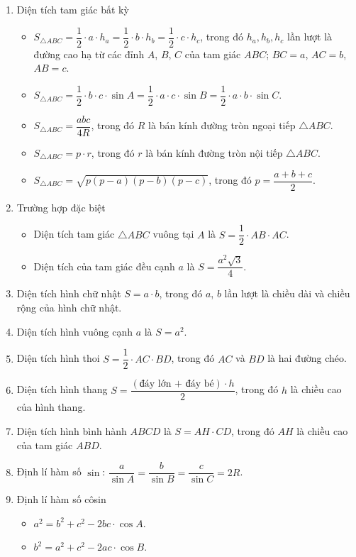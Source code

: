 \begin{khung}
\begin{enumerate}
		\item Diện tích tam giác bất kỳ
		\begin{itemize}
			\item $S_{\triangle ABC}=\dfrac{1}{2}\cdot a\cdot h_a=\dfrac{1}{2}\cdot b\cdot h_b=\dfrac{1}{2}\cdot c\cdot h_c$, trong đó $h_a, h_b, h_c$ lần lượt là đường cao hạ từ các đỉnh $A$, $B$, $C$ của tam giác $ABC$; $BC=a$, $AC=b$, $AB=c$.
			\item $S_{\triangle ABC} =\dfrac{1}{2}\cdot b\cdot c\cdot \sin A=\dfrac{1}{2}\cdot a\cdot c\cdot \sin B =\dfrac{1}{2}\cdot a\cdot b\cdot \sin C$.
			\item $S_{\triangle ABC}=\dfrac{abc}{4R}$, trong đó $R$ là bán kính đường tròn ngoại tiếp $\triangle ABC$.
			\item $S_{\triangle ABC}=p\cdot r$, trong đó $r$ là bán kính đường tròn nội tiếp $\triangle ABC$.
			\item $S_{\triangle ABC} =\sqrt{p(p-a)(p-b)(p-c)}$, trong đó $p=\dfrac{a+b+c}{2}$.
		\end{itemize}
		\item Trường hợp đặc biệt
		\begin{itemize}
			\item Diện tích tam giác $\triangle ABC$ vuông tại $A$ là $S=\dfrac{1}{2}\cdot AB \cdot AC$.
			\item Diện tích của tam giác đều cạnh $a$ là $S=\dfrac{a^2\sqrt{3}}{4}$.
		\end{itemize}
		\item Diện tích hình chữ nhật $S=a\cdot b$, trong đó $a$, $b$ lần lượt là chiều dài và chiều rộng của hình chữ nhật.
		\item Diện tích hình vuông cạnh $a$ là $S=a^2$.
		\item Diện tích hình thoi $S=\dfrac{1}{2}\cdot AC\cdot BD$, trong đó $AC$ và $BD$ là hai đường chéo.
		\item Diện tích hình thang $S=\dfrac{(\text{đáy lớn + đáy bé})\cdot h}{2}$, trong đó $h$ là chiều cao của hình thang.
		\item Diện tích hình bình hành $ABCD$ là $S=AH\cdot CD$, trong đó $AH$ là chiều cao của tam giác $ABD$.
		\item Định lí hàm số $\sin$: $\dfrac{a}{\sin A}=\dfrac{b}{\sin B}=\dfrac{c}{\sin C}=2R$.
		\item Định lí hàm số côsin
			\begin{itemize}
				\item $a^2=b^2+c^2-2bc\cdot\cos A$.
				\item $b^2=a^2+c^2-2ac\cdot \cos B$.

\end{itemize}
\end{enumerate}
\end{khung}
